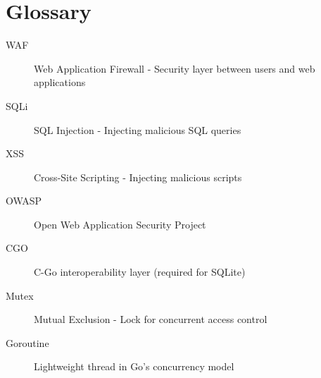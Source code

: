 \documentclass[11pt,a4paper]{report}
\begin{document}
\chapter{Glossary}

\begin{description}
    \item[WAF] Web Application Firewall - Security layer between users and web applications
    \item[SQLi] SQL Injection - Injecting malicious SQL queries
    \item[XSS] Cross-Site Scripting - Injecting malicious scripts
    \item[OWASP] Open Web Application Security Project
    \item[CGO] C-Go interoperability layer (required for SQLite)
    \item[Mutex] Mutual Exclusion - Lock for concurrent access control
    \item[Goroutine] Lightweight thread in Go's concurrency model
\end{description}
\end{document}
